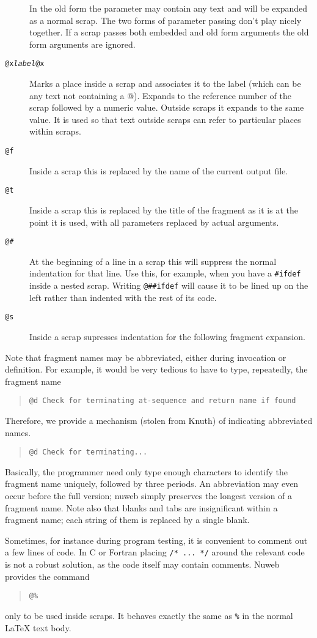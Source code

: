 \documentclass[a4paper]{report}
\begin{document}
\begin{description}
      In the old form the parameter may contain any text and will be
      expanded as a normal scrap. The two forms of parameter passing
      don't play nicely together. If a scrap passes both embedded and
      old form arguments the old form arguments are ignored.
\item[\tt @x{\em label}@x] Marks a place inside a scrap and
associates it to the label (which can be any text not containing
a @). Expands to the reference number of the scrap followed by a
numeric value. Outside scraps it expands to the same value. It is
used so that text outside scraps can refer to particular places
within scraps.
\item[\tt @f] Inside a scrap this is replaced by the name of the
current output file.
\item[\tt @t] Inside a scrap this is replaced by the title of the
fragment as it is at the point it is used, with all parameters
replaced by actual arguments.
\item[\tt @\#] At the beginning of a line in a scrap this will
suppress the normal indentation for that line. Use this, for
example, when you have a \verb|#ifdef| inside a nested scrap.
Writing \verb|@##ifdef| will cause it to be lined up on the left
rather than indented with the rest of its code.
\item[\tt @s] Inside a scrap supresses indentation for the following
fragment expansion.
\end{description}
Note that fragment names may be abbreviated, either during invocation or
definition. For example, it would be very tedious to have to
type, repeatedly, the fragment name
\begin{quote}
\verb|@d Check for terminating at-sequence and return name if found|
\end{quote}
Therefore, we provide a mechanism (stolen from Knuth) of indicating
abbreviated names.
\begin{quote}
\verb|@d Check for terminating...|
\end{quote}
Basically, the programmer need only type enough characters to
identify the fragment name uniquely, followed by three periods. An abbreviation
may even occur before the full version; nuweb simply preserves the
longest version of a fragment name. Note also that blanks and tabs are
insignificant within a fragment name; each string of them is replaced by a
single blank.

Sometimes, for instance during program testing, it is convenient to comment
out a few lines of code. In C or Fortran placing \verb|/* ... */| around the relevant
code is not a robust solution, as the code itself may contain
comments. Nuweb provides the command
\begin{quote}
\verb|@%|
\end{quote}only to be used inside scraps. It behaves exactly the same
as \verb|%| in the normal {\LaTeX} text body.
\end{document}
